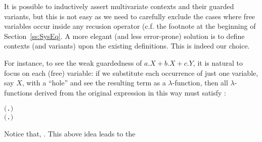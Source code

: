 It is possible to inductively assert multivariate contexts and their
guarded variants, but this is not easy as we need to carefully exclude the cases where
free variables occur inside any recusion operator (c.f. the footnote
at the beginning of Section~\ref{ss:SysEq}. A more elegant (and less
error-prone) solution is to define \multivariate contexts (and variants) upon the
existing \univariate definitions. This is indeed our choice.

For instance, to see the weak guardedness of $a.X + b.X + c.Y$, it is
natural to focus on each (free) variable: if we substitute each
occurrence of just one variable, say $X$, with a ``hole'' and see the
resulting term as a $\lambda$-function, then all $\lambda$-functions
derived from the original expression in this way must satisfy
:
\begin{alltt}
\HOLTokenTurnstile{}  \ensuremath{(}\HOLTokenLambda{}. \HOLSymConst{\ensuremath{\ldotp}} \HOLSymConst{\ensuremath{+}} \HOLSymConst{\ensuremath{\ldotp}} \HOLSymConst{\ensuremath{+}} \HOLSymConst{\ensuremath{\ldotp}} \ensuremath{)}
\HOLTokenTurnstile{}  \ensuremath{(}\HOLTokenLambda{}. \HOLSymConst{\ensuremath{\ldotp}}  \HOLSymConst{\ensuremath{+}} \HOLSymConst{\ensuremath{\ldotp}}  \HOLSymConst{\ensuremath{+}} \HOLSymConst{\ensuremath{\ldotp}}\ensuremath{)}
\end{alltt}
Notice that, . This above idea leads to the
